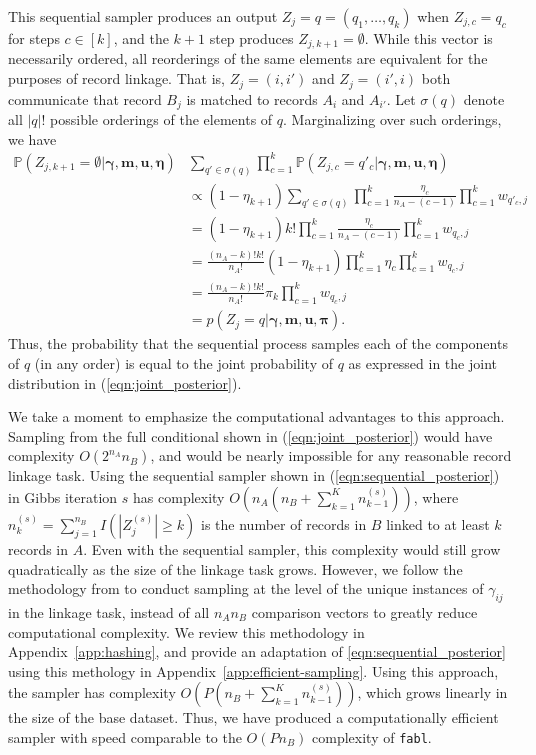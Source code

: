 \documentclass[12pt,letterpaper]{article}
\newcommand{\1}[1]{\mathbb{I}\!\left[#1\right]} %
\begin{document}
This sequential sampler produces an output $Z_j = q = (q_1, \ldots, q_k)$ when $Z_{j, c} = q_c$ for steps $c \in [k]$, and the $k+1$ step produces $Z_{j, k+1} = \emptyset$. While this vector is necessarily ordered, all reorderings of the same elements are equivalent for the purposes of record linkage.   That is, $Z_j = (i, i')$ and $Z_j = (i', i)$ both communicate that record $B_j$ is matched to records $A_i$ and $A_{i'}$. Let $\sigma(q)$ denote all $|q|!$ possible orderings of the elements of $q$. Marginalizing over such orderings, we have
\begin{align*}
	\mathbb{P}(Z_{j, k+1} = \emptyset | \bm{\gamma}, \bm{m}, \bm{u}, \bm{\eta}) &\sum_{q' \in \sigma(q)} \prod_{c = 1}^{k} \mathbb{P}(Z_{j, c} = q'_c|\bm{\gamma}, \bm{m}, \bm{u}, \bm{\eta}) \\
	&\propto (1 - \eta_{k+1}) \sum_{q' \in \sigma(q)} \prod_{c = 1}^{k} \frac{\eta_{c} }{n_A - (c - 1)}  \prod_{c = 1}^{k} w_{q'_c, j} \\
	&=(1 - \eta_{k+1}) k! \prod_{c = 1}^{k} \frac{\eta_{c} }{n_A - (c - 1)}  \prod_{c = 1}^{k} w_{q_c, j} \\
	&= \frac{(n_A - k)!k!}{n_A!} (1 - \eta_{k+1})\prod_{c = 1}^{k} \eta_{c} \prod_{c = 1}^{k} w_{q_c, j} \\
	&= \frac{(n_A - k)!k!}{n_A!} \pi_k \prod_{c = 1}^{k} w_{q_c, j} \\
	&= p\left(Z_j  = q |\bm{\gamma}, \bm{m}, \bm{u}, \bm{\pi}\right).
\end{align*}
Thus, the probability that the sequential process samples each of the components of $q$ (in any order) is equal to the joint probability of $q$ as expressed in the joint distribution in (\ref{eqn:joint_posterior}).

We take a moment to emphasize the computational advantages to this approach. Sampling from the full conditional shown in (\ref{eqn:joint_posterior}) would have complexity $O(2^{n_A}n_B)$, and would be nearly impossible for any reasonable record linkage task. Using the sequential sampler shown in (\ref{eqn:sequential_posterior}) in Gibbs iteration $s$ has complexity $O\left(n_A (n_B + \sum_{k=1}^K n_{k-1}^{(s)})\right)$, where $n_k^{(s)} = \sum_{j=1}^{n_B} I\left(|Z_j^{(s)}| \geq k\right)$ is the number of records in $B$ linked to at least $k$ records in $A$. Even with the sequential sampler, this complexity  would still grow quadratically as the size of the linkage task grows. However, we follow the methodology from \cite{kundinger_2023} to conduct sampling at the level of the unique instances of $\gamma_{ij}$ in the linkage task, instead of all $n_A n_B$ comparison vectors to greatly reduce computational complexity. We review this methodology in Appendix~\ref{app:hashing}, and provide an adaptation of \eqref{eqn:sequential_posterior} using this methology in Appendix~\ref{app:efficient-sampling}. Using this approach, the sampler has complexity $O\left(P (n_B + \sum_{k=1}^K n_{k-1}^{(s)})\right)$, which grows linearly in the size of the base dataset. Thus, we have produced a computationally efficient sampler with speed comparable to the $O(P n_B)$ complexity of \texttt{fabl}.
\end{document}
